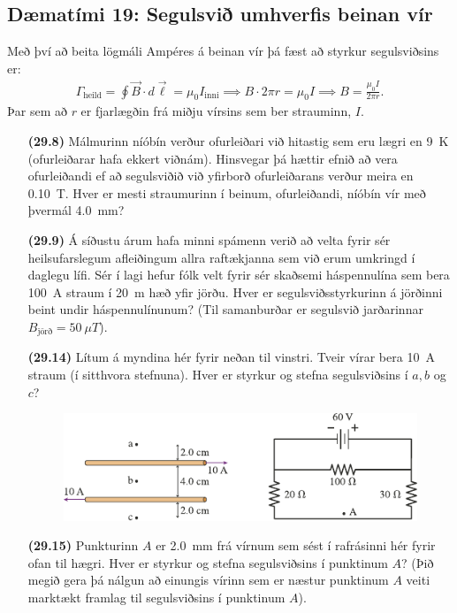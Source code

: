 \newpage


\subsection*{Dæmatími 19: Segulsvið umhverfis beinan vír}

\begin{tcolorbox}
Með því að beita lögmáli Ampéres á beinan vír þá fæst að styrkur segulsviðsins er:
\begin{align*}
    \Gamma_{\text{heild}} = \oint \vec{B} \cdot d \vec{\ell} = \mu_0 I_{\text{inni}} \implies B \cdot 2\pi r = \mu_0 I \implies B = \frac{\mu_0 I}{2\pi r}.
\end{align*}
Þar sem að $r$ er fjarlægðin frá miðju vírsins sem ber strauminn, $I$.
\end{tcolorbox}

\begin{enumerate}[label = \textbf{(\alph*)}]

\item[\textbf{(29.8)}] Málmurinn níóbín verður ofurleiðari við hitastig sem eru lægri en \SI{9}{K} (ofurleiðarar hafa ekkert viðnám). Hinsvegar þá hættir efnið að vera ofurleiðandi ef að segulsviðið við yfirborð ofurleiðarans verður meira en \SI{0.10}{T}. Hver er mesti straumurinn í beinum, ofurleiðandi, níóbín vír með þvermál \SI{4.0}{mm}?

\item[\textbf{(29.9)}]  Á síðustu árum hafa minni spámenn verið að velta fyrir sér heilsufarslegum afleiðingum allra raftækjanna sem við erum umkringd í daglegu lífi. Sér í lagi hefur fólk velt fyrir sér skaðsemi háspennulína sem bera \SI{100}{A} straum í \SI{20}{m} hæð yfir jörðu. Hver er segulsviðsstyrkurinn á jörðinni beint undir háspennulínunum? (Til samanburðar er segulsvið jarðarinnar $B_{\text{jörð}} = \SI{50}{\mu T}$).

\item[\textbf{(29.14)}] Lítum á myndina hér fyrir neðan til vinstri. Tveir vírar bera \SI{10}{A} straum (í sitthvora stefnuna). Hver er styrkur og stefna segulsviðsins í $a, b$ og $c$?

\begin{figure}[H]
    \centering
    \includegraphics[scale = 1.25]{figures/rk2914.pdf}
\end{figure}

\item[\textbf{(29.15)}] Punkturinn $A$ er \SI{2.0}{mm} frá vírnum sem sést í rafrásinni hér fyrir ofan til hægri. Hver er styrkur og stefna segulsviðsins í punktinum $A$? (Þið megið gera þá nálgun að einungis vírinn sem er næstur punktinum $A$ veiti marktækt framlag til segulsviðsins í punktinum $A$).

\end{enumerate}


